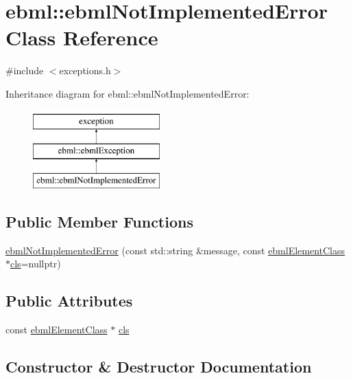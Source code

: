 \hypertarget{classebml_1_1ebmlNotImplementedError}{}\section{ebml\+:\+:ebml\+Not\+Implemented\+Error Class Reference}
\label{classebml_1_1ebmlNotImplementedError}


{\ttfamily \#include $<$exceptions.\+h$>$}

Inheritance diagram for ebml\+:\+:ebml\+Not\+Implemented\+Error\+:\begin{figure}[H]
\begin{center}
\leavevmode
\includegraphics[height=3.000000cm]{classebml_1_1ebmlNotImplementedError}
\end{center}
\end{figure}
\subsection*{Public Member Functions}
\begin{DoxyCompactItemize}
\item 
\mbox{\hyperlink{classebml_1_1ebmlNotImplementedError_aef5d5bfbae1bb89105fc7cf89563e710}{ebml\+Not\+Implemented\+Error}} (const std\+::string \&message, const \mbox{\hyperlink{classebml_1_1ebmlElementClass}{ebml\+Element\+Class}} $\ast$\mbox{\hyperlink{classebml_1_1ebmlNotImplementedError_affef6ae492f6c0ab0c22970955a2e8c9}{cls}}=nullptr)
\end{DoxyCompactItemize}
\subsection*{Public Attributes}
\begin{DoxyCompactItemize}
\item 
const \mbox{\hyperlink{classebml_1_1ebmlElementClass}{ebml\+Element\+Class}} $\ast$ \mbox{\hyperlink{classebml_1_1ebmlNotImplementedError_affef6ae492f6c0ab0c22970955a2e8c9}{cls}}
\end{DoxyCompactItemize}


\subsection{Constructor \& Destructor Documentation}
\mbox{\label{classebml_1_1ebmlNotImplementedError_aef5d5bfbae1bb89105fc7cf89563e710}} 
